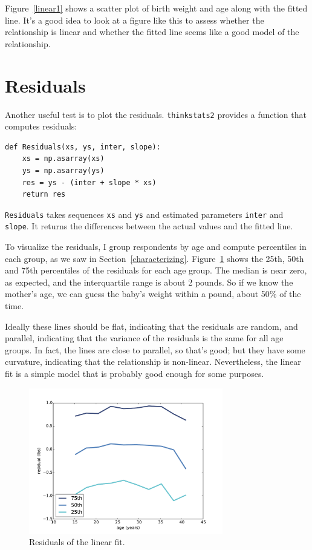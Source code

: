 \documentclass[12pt]{book}
\begin{document}
Figure~\ref{linear1} shows a scatter plot of birth weight and age
along with the fitted line.  It's a good idea to look at a figure like
this to assess whether the relationship is linear and whether the
fitted line seems like a good model of the relationship.


\section{Residuals}
\label{residuals}

Another useful test is to plot the residuals.
{\tt thinkstats2} provides a function that computes residuals:

\begin{verbatim}
def Residuals(xs, ys, inter, slope):
    xs = np.asarray(xs)
    ys = np.asarray(ys)
    res = ys - (inter + slope * xs)
    return res
\end{verbatim}

{\tt Residuals} takes sequences {\tt xs} and {\tt ys} and
estimated parameters {\tt inter} and {\tt slope}.  It returns
the differences between the actual values and the fitted line.

To visualize the residuals, I group respondents by age and compute
percentiles in each group, as we saw in Section~\ref{characterizing}.
Figure~\ref{linear2} shows the 25th, 50th and 75th percentiles of
the residuals for each age group.  The median is near zero, as
expected, and the interquartile range is about 2 pounds.  So if we
know the mother's age, we can guess the baby's weight within a pound,
about 50\% of the time.

Ideally these lines should be flat, indicating that the residuals are
random, and parallel, indicating that the variance of the residuals is
the same for all age groups.  In fact, the lines are close to
parallel, so that's good; but they have some curvature, indicating
that the relationship is non-linear.  Nevertheless, the linear fit
is a simple model that is probably good enough for some purposes.

\begin{figure}
\centerline{\includegraphics[height=2.5in]{figs/linear2.pdf}}
\caption{Residuals of the linear fit.}
\label{linear2}
\end{figure}
\end{document}
